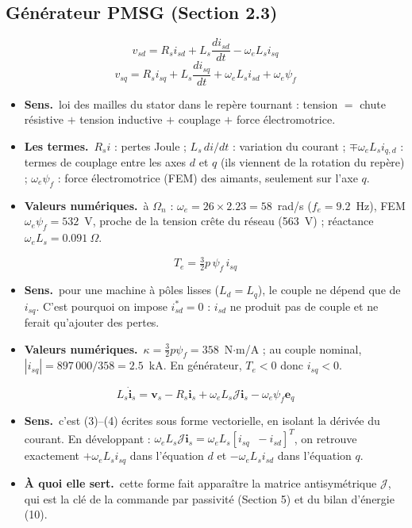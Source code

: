 \documentclass[11pt,a4paper]{article}
\newcommand{\bv}[1]{\mathbf{#1}}
\newcommand{\Jm}{\boldsymbol{\mathcal{J}}}
\newenvironment{expl}{\begin{itemize}[leftmargin=1.2em,itemsep=2pt,topsep=2pt]}{\end{itemize}}
\newcommand{\sens}{\item \textbf{Sens.}~}
\newcommand{\termes}{\item \textbf{Les termes.}~}
\newcommand{\num}{\item \textbf{Valeurs numériques.}~}
\newcommand{\role}{\item \textbf{À quoi elle sert.}~}
\begin{document}
\subsection{Générateur PMSG (Section 2.3)}
\begin{equation}\tag{3}
v_{sd} = R_s i_{sd} + L_s\frac{di_{sd}}{dt} - \omega_e L_s i_{sq}
\end{equation}
\begin{equation}\tag{4}
v_{sq} = R_s i_{sq} + L_s\frac{di_{sq}}{dt} + \omega_e L_s i_{sd} + \omega_e\psi_f
\end{equation}
\begin{expl}
\sens loi des mailles du stator dans le repère tournant : tension $=$ chute résistive $+$ tension
inductive $+$ couplage $+$ force électromotrice.
\termes $R_si$ : pertes Joule ; $L_s\,di/dt$ : variation du courant ; $\mp\omega_eL_si_{q,d}$ :
termes de couplage entre les axes $d$ et $q$ (ils viennent de la rotation du repère) ;
$\omega_e\psi_f$ : force électromotrice (FEM) des aimants, seulement sur l'axe $q$.
\num à $\Omega_n$ : $\omega_e=26\times2.23=58$~rad/s ($f_e=9.2$~Hz), FEM $\omega_e\psi_f=532$~V,
proche de la tension crête du réseau (563~V) ; réactance $\omega_eL_s=0.091~\Omega$.
\end{expl}

\begin{equation}\tag{5}
T_e = \tfrac32 p\,\psi_f\, i_{sq}
\end{equation}
\begin{expl}
\sens pour une machine à pôles lisses ($L_d=L_q$), le couple ne dépend que de $i_{sq}$. C'est pourquoi on
impose $i_{sd}^*=0$ : $i_{sd}$ ne produit pas de couple et ne ferait qu'ajouter des pertes.
\num $\kappa=\frac32p\psi_f=358$~N$\cdot$m/A ; au couple nominal, $|i_{sq}|=897\,000/358=2.5$~kA.
En générateur, $T_e<0$ donc $i_{sq}<0$.
\end{expl}

\begin{equation}\tag{6}
L_s\dot{\bv{i}}_s = \bv{v}_s - R_s\bv{i}_s + \omega_eL_s\Jm\bv{i}_s - \omega_e\psi_f\bv{e}_q
\end{equation}
\begin{expl}
\sens c'est (3)--(4) écrites sous forme vectorielle, en isolant la dérivée du courant. En développant :
$\omega_eL_s\Jm\bv i_s=\omega_eL_s[i_{sq}\;\;-i_{sd}]^T$, on retrouve exactement $+\omega_eL_si_{sq}$ dans
l'équation $d$ et $-\omega_eL_si_{sd}$ dans l'équation $q$.
\role cette forme fait apparaître la matrice antisymétrique $\Jm$, qui est la clé de la commande par
passivité (Section 5) et du bilan d'énergie (10).
\end{expl}
\end{document}
